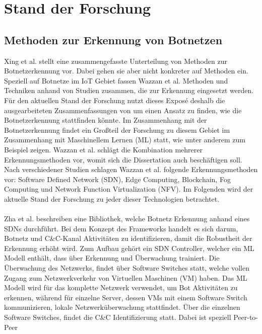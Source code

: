\section{Stand der Forschung}
\label{sec:research}

\subsection*{Methoden zur Erkennung von Botnetzen}
Xing et al. \cite{Xing2021SurveyOB} stellt eine zusammengefasste Unterteilung von Methoden zur Botnetzerkennung vor. Dabei gehen sie aber nicht konkreter auf Methoden ein. 
Speziell auf Botnetze im IoT Gebiet fassen Wazzan et al. \cite{Wazzan2021InternetOT} Methoden und Techniken anhand von Studien zusammen, die zur Erkennung 
eingesetzt werden. Für den aktuellen Stand der Forschung nutzt dieses Exposé deshalb die ausgearbeiteten Zusammenfassungen von \cite{Wazzan2021InternetOT} um einen 
Ansatz zu finden, wie die Botnetzerkennung stattfinden könnte.
Im Zusammenhang mit der Botnetzerkennung findet ein Großteil der Forschung zu diesem Gebiet im Zusammenhang mit Maschinellem Lernen (ML) statt, wie unter anderem zum Beispiel
\cite{SAlrayes2022ModelingOB,DBLP:journals/comcom/Alani22,Habtamu2022ASR, D2022ARO} zeigen. Wazzan et al. schlägt die Kombination 
mehrerer Erkennungsmethoden vor, womit sich die Dissertation auch beschäftigen soll. Nach verschiedener Studien schlagen Wazzan et al. folgende Erkennungsmethoden vor: 
Software Defined Network (SDN), Edge Computing, Blockchain, Fog Computing und Network Function Virtualization (NFV). Im Folgenden wird der aktuelle Stand der Forschung zu jeder dieser 
Technologien betrachtet. \\ \\ Zha et al. \cite{DBLP:conf/cns/Zha0GMC19} beschreiben eine Bibliothek, welche Botnetz Erkennung anhand eines SDNs durchführt. 
Bei dem Konzept des Frameworks handelt es sich darum, Botnetz und C\&C-Kanal Aktivitäten zu identifizieren, damit die Robustheit der Erkennung erhöht wird. Zum Aufbau gehört ein SDN 
Controller, welcher ein ML Modell enthält, dass über Erkennung und Überwachung trainiert. Die Überwachung des Netzwerks, findet über Software Switches statt, welche vollen Zugang zum 
Netzwerkverkehr von Virtuellen Maschinen (VM) haben. Das ML Modell wird für das komplette Netzwerk verwendet, um Bot Aktivitäten zu erkennen, während für einzelne Server, dessen VMs mit 
einem Software Switch kommunizieren, lokale Netzwerküberwachung stattfindet. Über die einzelnen Software Switches, findet die C\&C Identifizierung statt. Dabei ist speziell Peer-to-Peer 
